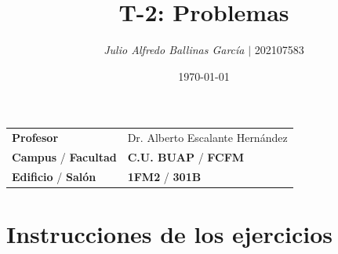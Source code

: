 \documentclass{article}
\title{ \textcolor{Tarawera}{\textbf{T-\textcolor{Sun}{\textbf{2}}}}: \textcolor{Cinnabar}{\textbf{Problemas}}}
\author{\emph{Julio Alfredo Ballinas García} $\boldsymbol{\mid}$ 202107583}
\date{\today}
\begin{document}
\maketitle



\begin{mybox}
	\noindent\begin{tabular}{@{}ll}
		{\bfseries{Profesor}} & Dr. Alberto Escalante Hernández\\
		\textcolor{prussianblue}{\bfseries{Campus}} / \textcolor{trueblue}{\bfseries{Facultad}}  & \textcolor{prussianblue}{\bfseries{C.U. BUAP}} /  \textcolor{trueblue}{\bfseries{FCFM}} \\
		\textcolor{prussianblue}{\bfseries{Edificio}} /  \textcolor{trueblue}{\bfseries{Salón}}    & 	\textcolor{prussianblue}{\bfseries{1FM2}} /  \textcolor{trueblue}{\bfseries{301B}}   
	\end{tabular} 
\end{mybox} \vspace{1cm}

\section*{Instrucciones de los ejercicios}
\end{document}
